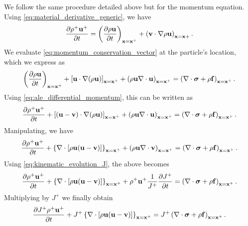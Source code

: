 \documentclass[oneside,a4paper,11pt]{report}
\begin{document}
We follow the same procedure detailed above but for the momentum equation. Using \cref{eq:material_derivative_generic}, we have
\begin{equation}
\label{eq:ale_differential_momentum}
    \frac{\partial \rho^+ \mathbf{u}^+}{\partial t} = \left ( \frac{\partial \rho \mathbf{u}}{\partial t} \right )_{\mathbf{x} = \mathbf{x}^+} + \left(\mathbf{v} \cdot \nabla \rho \mathbf{u} \right)_{\mathbf{x} = \mathbf{x} +}.
\end{equation}
We evaluate \cref{eq:momentum_conservation_vector} at the particle's location, which we express as
\begin{equation*}
\left ( \frac{\partial \rho\mathbf{u} }{\partial t} \right )_{\mathbf{x} = \mathbf{x}^+} + \left [ \mathbf{u} \cdot \nabla (\rho\mathbf{u} ) \right]_{\mathbf{x} = \mathbf{x}^+} + \left ( \rho \mathbf{u} \nabla \cdot \mathbf{u} \right)_{\mathbf{x} = \mathbf{x}^+} = \left ( \nabla\cdot \bm \sigma +\rho \mathbf{f} \right)_{\mathbf{x} = \mathbf{x}^+}.
\end{equation*}
Using \cref{eq:ale_differential_momentum}, this can be written as
\begin{equation*}
\frac{\partial \rho^+ \mathbf{u}^+}{\partial t} + \left [ (\mathbf{u} - \mathbf{v}) \cdot \nabla (\rho\mathbf{u} ) \right]_{\mathbf{x} = \mathbf{x}^+} + \left ( \rho \mathbf{u} \nabla \cdot \mathbf{u} \right)_{\mathbf{x} = \mathbf{x}^+} = \left ( \nabla\cdot \bm \sigma +\rho \mathbf{f} \right)_{\mathbf{x} = \mathbf{x}^+}.
\end{equation*}
Manipulating, we have
\begin{equation*}
\frac{\partial \rho^+ \mathbf{u}^+}{\partial t} + \left \{ \nabla \cdot [\rho \mathbf{u} (\mathbf{u} - \mathbf{v}) ] \right \}_{\mathbf{x} = \mathbf{x}^+} + \left ( \rho \mathbf{u} \nabla \cdot \mathbf{v} \right)_{\mathbf{x} = \mathbf{x}^+} = \left ( \nabla \cdot \bm \sigma +\rho \mathbf{f} \right)_{\mathbf{x} = \mathbf{x}^+}.
\end{equation*}
Using \cref{eq:kinematic_evolution_J}, the above becomes
\begin{equation*}
\frac{\partial \rho^+ \mathbf{u}^+}{\partial t} + \left \{ \nabla \cdot [\rho \mathbf{u} (\mathbf{u} - \mathbf{v}) ] \right \}_{\mathbf{x} = \mathbf{x}^+} + \rho^+ \mathbf{u}^+ \frac{1}{J^+} \frac{\partial J^+}{\partial t} = \left ( \nabla\cdot \bm \sigma +\rho \mathbf{f} \right)_{\mathbf{x} = \mathbf{x}^+}.
\end{equation*}
Multiplying by $J^+$ we finally obtain 
\begin{equation}
    \label{eq:ale_differential_momentum_conservation}
\frac{\partial J^+ \rho^+ \mathbf{u}^+}{\partial t} + J^+ \left \{ \nabla \cdot [\rho \mathbf{u} (\mathbf{u} - \mathbf{v}) ] \right \}_{\mathbf{x} = \mathbf{x}^+} = J^+ \left ( \nabla \cdot \bm \sigma +\rho \mathbf{f} \right)_{\mathbf{x} = \mathbf{x}^+}.
\end{equation}
\end{document}
